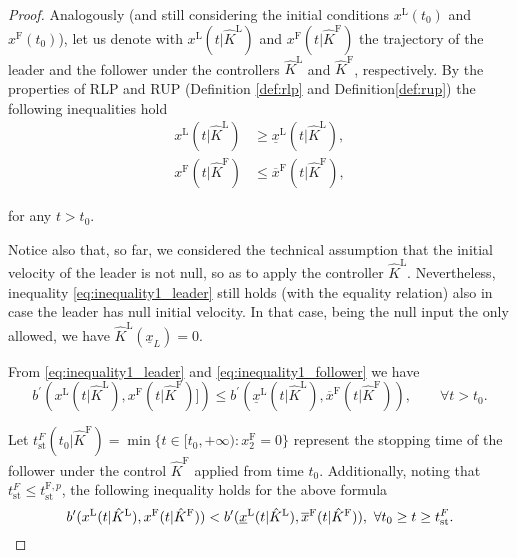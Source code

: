 \begin{theorem}
\begin{proof}
		
		Analogously (and still considering the initial conditions $x^\mathrm{L}(t_0)$ and $x^\mathrm{F}(t_0)$), let us denote with $x^\mathrm{L}(t | \hat{K}^\mathrm{L})$  and $x^\mathrm{F}(t | \hat{K}^\mathrm{F})$ the trajectory of the leader and the follower under the controllers $\hat{K}^\mathrm{L}$ and $\hat{K}^\mathrm{F}$, respectively.
		By the properties of RLP and RUP (Definition \ref{def:rlp} and Definition\tildeAdd\ref{def:rup}) the following inequalities hold
		\begin{subequations}\label{eq:inequality1}
			\begin{align}
				x^\mathrm{L}(t | \hat{K}^\mathrm{L}) &\geq \underline{x}^\mathrm{L}(t | \hat{K}^\mathrm{L}), \label{eq:inequality1_leader}\\
				x^\mathrm{F}(t | \hat{K}^\mathrm{F}) &\leq \overline{x}^\mathrm{F}(t | \hat{K}^\mathrm{F}),\label{eq:inequality1_follower}
			\end{align}
		\end{subequations}
		
		for any $t>t_0$.
		
		Notice also that, so far, we considered the technical assumption that the initial velocity of the leader is not null, so as to apply the controller $\hat{K}^\mathrm{L}$. Nevertheless, inequality \eqref{eq:inequality1_leader} still holds (with the equality relation) also in case the leader has null initial velocity. In that case, being the null input the only allowed, we have $\hat{K}^\mathrm{L}(\underline{x}_L)=0$.
		
		From \eqref{eq:inequality1_leader} and \eqref{eq:inequality1_follower} we have 
		\begin{equation}\label{eq:decrease_b_prime_proxies}
			b^\prime(x^\mathrm{L}(t | \hat{K}^\mathrm{L}),x^\mathrm{F}(t |\hat{K}^\mathrm{F})])\leq  b^\prime(\underline{x}^\mathrm{L}(t | \hat{K}^\mathrm{L}),\overline{x}^\mathrm{F}(t | \hat{K}^\mathrm{F})), \qquad \forall t>t_0. 
		\end{equation}
		
		Let $t_{\mathrm{st}}^{F}(t_0 | \hat{K}^\mathrm{F}) = \min\{t \in [t_0, +\infty) : x_2^\mathrm{F} = 0\}$ represent the stopping time of the follower under the control $\hat{K}^\mathrm{F}$ applied from time $t_0$. Additionally, noting that $t_{\mathrm{st}}^{F} \leq t_{\mathrm{st}}^{\mathrm{F},p}$, the following inequality holds for the above formula
		\begin{equation*}
			b^\prime(x^\mathrm{L}(t | \hat{K}^\mathrm{L}),x^\mathrm{F}(t |\hat{K}^\mathrm{F}))<  b^\prime(\underline{x}^\mathrm{L}(t | \hat{K}^\mathrm{L}),\overline{x}^\mathrm{F}(t | \hat{K}^\mathrm{F})), \,\, \forall t_0\geq t\geq t_{\mathrm{st}}^{F} \\ . 
		\end{equation*}
		

\end{proof}
\end{theorem}
